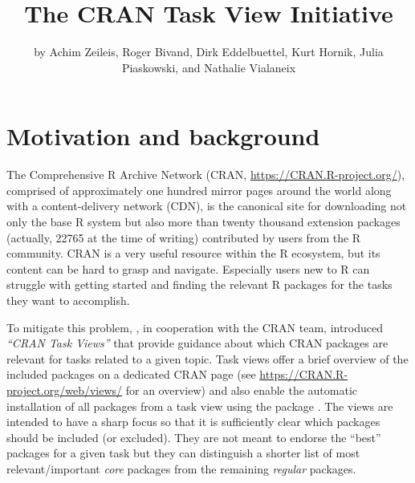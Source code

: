 \title{The CRAN Task View Initiative}


\author{by Achim Zeileis, Roger Bivand, Dirk Eddelbuettel, Kurt Hornik, Julia Piaskowski, and Nathalie Vialaneix}

\maketitle


\section{Motivation and background}\label{motivation-and-background}

The Comprehensive R Archive Network (CRAN, \url{https://CRAN.R-project.org/}), comprised
of approximately one hundred mirror pages around the world along with a content-delivery network (CDN), is the canonical site
for downloading not only the base R system \citep{r-base} but also more than twenty thousand extension packages
(actually, 22765 at the time of writing) contributed by users from
the R community. CRAN is a very useful resource within the R
ecosystem, but its content can be hard to grasp and navigate. Especially users new to R
can struggle with getting started and finding the relevant R packages for the
tasks they want to accomplish.

To mitigate this problem, \citet{ctv-intro}, in cooperation with the CRAN team, introduced
\emph{``CRAN Task Views''} that provide guidance about which CRAN packages
are relevant for tasks related to a given topic. Task views offer a brief overview of
the included packages on a dedicated CRAN page (see
\url{https://CRAN.R-project.org/web/views/} for an overview) and also enable the
automatic installation of all packages from a task view using the
 package \citep{ctv-pkg}. The views are intended to have a sharp focus so
that it is sufficiently clear which packages should be included (or excluded).
They are not meant to endorse the ``best'' packages for a given task but they can
distinguish a shorter list of most relevant/important \emph{core} packages from the
remaining \emph{regular} packages.

